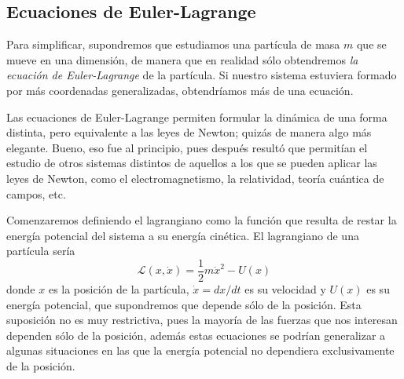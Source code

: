 \subsection{Ecuaciones de Euler-Lagrange}
Para simplificar, supondremos que estudiamos una partícula de masa $m$
que se mueve en una dimensión, de manera que en realidad sólo
obtendremos \emph{la ecuación de Euler-Lagrange} de la partícula. Si
nuestro sistema estuviera formado por más coordenadas generalizadas,
obtendríamos más de una ecuación.

Las ecuaciones de Euler-Lagrange permiten formular la dinámica de una
forma distinta, pero equivalente a las leyes de Newton; quizás de
manera algo más elegante. Bueno, eso fue al principio, pues después
resultó que permitían el estudio de otros sistemas distintos de
aquellos a los que se pueden aplicar las leyes de Newton, como el
electromagnetismo, la relatividad, teoría cuántica de campos, etc.

Comenzaremos definiendo el lagrangiano como la función que resulta de
restar la energía potencial del sistema a su energía cinética.
El lagrangiano de una partícula sería
\[
  \mathcal{L}(x,\dot{x})
  =
  \dfrac{1}{2}m\dot{x}^2 - U(x)
\]
donde $x$ es la posición de la partícula, $\dot{x}=dx/dt$ es su velocidad y
$U(x)$ es su energía potencial, que supondremos que depende sólo de la
posición. Esta suposición no es muy restrictiva, pues la mayoría de
las fuerzas que nos interesan dependen sólo de la posición, además
estas ecuaciones se podrían generalizar a algunas situaciones en las
que la energía potencial no dependiera exclusivamente de la posición.

